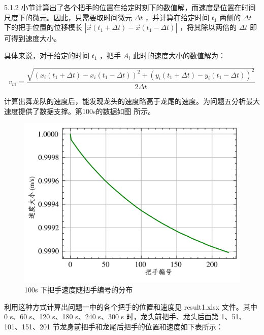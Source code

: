\documentclass[a4paper]{article}
\begin{document}
		5.1.2 小节计算出了各个把手的位置在给定时刻下的数值解，而速度是位置在时间尺度下的微元。因此，只需要取时间微元 $\Delta t$ ，并计算在给定时间 $t_1$ 两侧的 $\Delta t$ 下的把手位置的位移模长 $|\vec{x}(t_1+\Delta t) - \vec{x}(t_1 - \Delta t)|$ ，将其除以两倍的 $\Delta t$ 即可得到速度大小。



		具体来说，对于给定的时间 $t_1$ ，把手 $A_i$ 此时的速度大小的数值解为：

		\begin{equation}
			v_{t1} = \dfrac{\sqrt{(x_i(t_1 + \Delta t) - x_i(t_1 - \Delta t))^2 + (y_i(t_1 + \Delta t) - y_i(t_1 - \Delta t))^2}}{2\Delta t}
		\end{equation}
		
		计算出舞龙队的速度后，能发现龙头的速度略高于龙尾的速度。为问题五分析最大速度提供了数据支撑。第100s的数据如图%
		所示。
		
		\begin{figure}[H]
			\centering
			\includegraphics[width=0.5\linewidth]{image/Figure_5131.png}
			\caption{100s 下把手速度随把手编号的分布}
			\label{Figure_5131}
		\end{figure}
		

		利用这种方式计算出问题一中的各个把手的位置和速度见 result1.xlsx 文件。其中 0 s、60 s、120 s、180 s、240 s、300 s 时，龙头前把手、龙头后面第 1、51、101、151、201 节龙身前把手和龙尾后把手的位置和速度如下表所示：
\end{document}
